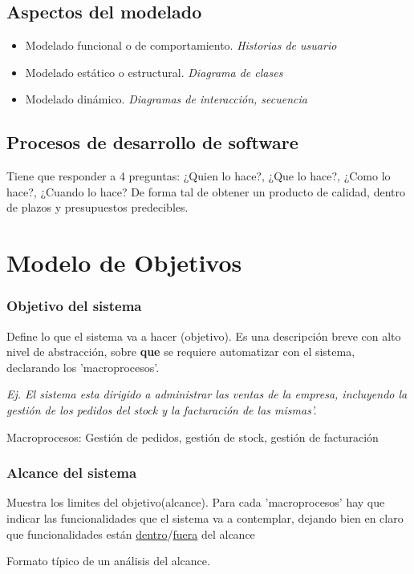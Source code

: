 \documentclass[titlepage,a4paper]{article}
\begin{document}
\subsection*{Aspectos del modelado}
\begin{itemize}
    \item Modelado funcional o de comportamiento. \textit{Historias de usuario}
    \item Modelado estático o estructural. \textit{Diagrama de clases}
    \item Modelado dinámico. \textit{Diagramas de interacción, secuencia}
\end{itemize}

\subsection{Procesos de desarrollo de software}

Tiene que responder a 4 preguntas: ¿Quien lo hace?, ¿Que lo hace?, ¿Como lo hace?, ¿Cuando lo hace?
De forma tal de obtener un producto de calidad, dentro de plazos y presupuestos predecibles.

\section{Modelo de Objetivos}
\subsubsection*{Objetivo del sistema}
Define lo que el sistema va a hacer (objetivo).
Es una descripción breve con alto nivel de abstracción, sobre \textbf{que} se requiere automatizar con el sistema, declarando los 'macroprocesos'.

\textit{Ej.
El sistema esta dirigido a administrar las ventas de la empresa, incluyendo la gestión de los pedidos del stock y la facturación de las mismas'.}

Macroprocesos: Gestión de pedidos, gestión de stock, gestión de facturación

\subsubsection*{Alcance del sistema}
Muestra los limites del objetivo(alcance). Para cada 'macroprocesos' hay que indicar las funcionalidades que el sistema va a contemplar,
dejando bien en claro que funcionalidades están \underline{dentro}/\underline{fuera} del alcance

Formato típico de un análisis del alcance.
\end{document}
